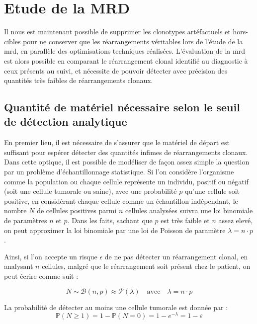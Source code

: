 \section{Etude de la MRD}

Il nous est maintenant possible de supprimer les clonotypes artéfactuels et
hors-cibles pour ne conserver que les réarrangements véritables lors de l'étude
de la \gls{mrd}, en parallèle des optimisations techniques réalisées.
L'évaluation de la \gls{mrd} est alors possible en comparant le réarrangement
clonal identifié au diagnostic à ceux présents au suivi, et nécessite de
pouvoir détecter avec précision des quantités très faibles de réarrangements
clonaux.

\subsection{Quantité de matériel nécessaire selon le seuil de détection analytique}

En premier lieu, il est nécessaire de s'assurer que le matériel de départ est
suffisant pour espérer détecter des quantités infimes de réarrangements
clonaux. Dans cette optique, il est possible de modéliser de façon assez simple
la question par un problème d'échantillonnage statistique. Si l'on considère
l'organisme comme la population ou chaque cellule représente un individu,
positif ou négatif (soit une cellule tumorale ou saine), avec une probabilité
$p$ qu'une cellule soit positive, en considérant chaque cellule comme un
échantillon indépendant, le nombre $N$ de cellules positives parmi $n$ cellules
analysées suivra une loi binomiale de paramètres $n$ et $p$. Dans les faits,
sachant que $p$ est très faible et $n$ assez elevé, on peut approximer la loi binomiale par une
loi de Poisson de paramètre $\lambda = n \cdot p$.

Ainsi, si l'on accepte un risque $\epsilon$ de ne pas détecter un réarrangement
clonal, en analysant $n$ cellules, malgré que le réarrangement soit présent
chez le patient, on peut écrire comme suit :

\begin{equation}
    N \sim \mathcal{B}(n, p) \approx \mathcal{P}(\lambda)
    \quad \text{avec} \quad \lambda = n \cdot p
\end{equation}

La probabilité de détecter au moins une cellule tumorale est donnée par :
\begin{equation}
    \mathbb{P}(N \geq 1) = 1 - \mathbb{P}(N = 0) = 1 - e^{-\lambda} = 1 - \varepsilon
\end{equation}


